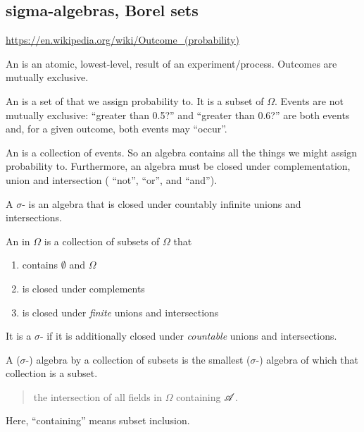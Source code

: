 \subsection{sigma-algebras, Borel sets}

\url{https://en.wikipedia.org/wiki/Outcome_(probability)}


An  is an atomic, lowest-level, result of an experiment/process. Outcomes are mutually exclusive.

An  is a set of  that we assign probability to. It is a subset of $\Omega$. Events are not mutually
exclusive: ``greater than 0.5?​'' and ``greater than 0.6?​'' are both events and, for a given outcome, both events
may ``occur​''.

An  is a collection of events. So an algebra contains all the things we might assign probability to.
Furthermore, an algebra must be closed under complementation, union and intersection ( ``not​'', ``or​'', and ``and​'').

A $\sigma$- is an algebra that is closed under countably infinite unions and intersections.




\begin{definition*}
  An  in $\Omega$ is a collection of subsets of $\Omega$ that
  \begin{enumerate}
  \item contains $\emptyset$ and $\Omega$
  \item is closed under complements
  \item is closed under {\it finite} unions and intersections
  \end{enumerate}

  It is a $\sigma$- if it is additionally closed under {\it countable} unions and intersections.
\end{definition*}

\begin{definition}
  A ($\sigma$-) algebra  by a collection of subsets is the smallest ($\sigma$-) algebra of which that
  collection is a subset.
\end{definition}


\begin{quote}
  the intersection of all fields in $\Omega$ containing $\mathscr A$.
\end{quote}

Here, ``containing​'' means subset inclusion.

